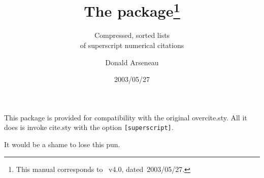 \documentclass[pagesize=auto, fontsize=14pt, parskip=full, DIV=10]{scrartcl}
\title{The \pkg{overcite} package\thanks{This manual corresponds to \pkg{overcite}~v4.0, dated~2003/05/27.}}
\subtitle{Compressed, sorted lists\\of superscript numerical citations}
\author{Donald Arseneau}
\date{2003/05/27}
\newcommand*{\pkg}[1]{\textsf{#1}}
\newcommand*{\opt}[1]{\texttt{#1}}
\begin{document}
\maketitle

This package is provided for compatibility with the original 
\pkg{overcite.sty}.  All it does is invoke \pkg{cite.sty} with the option
\opt{[superscript]}.

It would be a shame to lose this pun.
\end{document}
